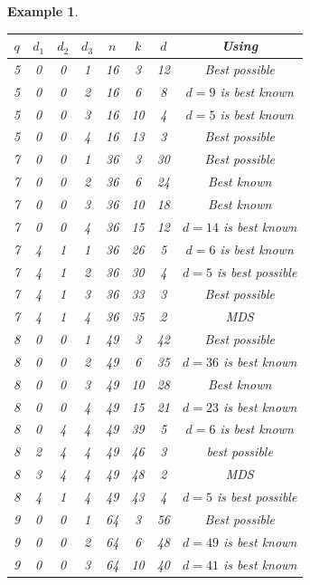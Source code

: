 \documentclass[12pt]{article}
\newtheorem{example}[theorem]{Example}
\begin{document}
\begin{example}
\begin{center}
\begin{tabular}{|c|c|c|c|c|c|c|c|}\hline
$q$ & $d_1$ & $d_2$ & $d_3$ & $n$ & $k$ & $d$ & Using \cite{B} \\ \hline
5    &  0     &  0     &  1     &  16   &  3   &  12 & Best possible   \\
5    &  0     &  0     &  2     &  16   &  6   &  8  & $d=9$ is best known \\
5    &  0     &  0     &  3     &  16   &  10   &  4  & $d=5$ is best known \\
5    &  0     &  0     &  4     &  16   &  13   &  3 & Best possible   \\
7    &  0     &  0     &  1     &  36   &  3   &  30  & Best possible   \\
7    &  0     &  0     &  2     &  36   &  6   &  24  & Best known \\
7    &  0     &  0     &  3     &  36   &  10   &  18  & Best known \\
7    &  0     &  0     &  4     &  36   &  15   &  12  & $d=14$ is best known \\
7    &  4     &  1     &  1     &  36   &  26   &  5  & $d=6$ is best known \\
7    &  4     &  1     &  2     &  36   &  30   &  4 & $d=5$ is best possible    \\
7    &  4     &  1     &  3     &  36   &  33   &  3 & Best possible   \\
7    &  4     &  1     &  4     &  36   &  35   &  2  & MDS \\
8    &  0     &  0     &  1     &  49   &  3   &   42  & Best possible \\
8    &  0     &  0     &  2     &  49   &  6   &   35  & $d=36$ is best known   \\
8    &  0     &  0     &  3     &  49   &  10   &  28  & Best known \\
8    &  0     &  0     &  4     &  49   &  15   &  21  & $d=23$ is best known \\
8    &  0     &  4     &  4     &  49   &  39   &  5 & $d=6$ is best known   \\
8    &  2     &  4     &  4     &  49   &  46   &  3 & best possible   \\
8    &  3     &  4     &  4     &  49   &  48   &  2 & MDS  \\
8    &  4     &  1     &  4     &  49   &  43   &  4 & $d=5$ is best possible   \\
9    &  0     &  0     &  1     &  64   &   3  &   56  & Best possible  \\
9    &  0     &  0     &  2     &  64   &   6  &   48  & $d=49$ is best known  \\
9    &  0     &  0     &  3     &  64   &   10  &  40  & $d=41$ is best known \\

\hline
\end{tabular}

\end{center}

\end{example}
\end{document}
